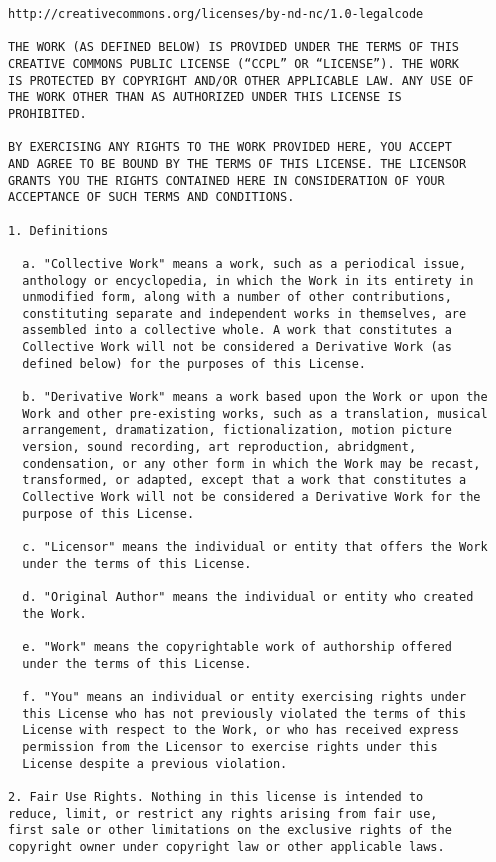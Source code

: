 \begin{Verbatim}[fontsize=\footnotesize]
http://creativecommons.org/licenses/by-nd-nc/1.0-legalcode

THE WORK (AS DEFINED BELOW) IS PROVIDED UNDER THE TERMS OF THIS
CREATIVE COMMONS PUBLIC LICENSE (“CCPL” OR “LICENSE”). THE WORK
IS PROTECTED BY COPYRIGHT AND/OR OTHER APPLICABLE LAW. ANY USE OF
THE WORK OTHER THAN AS AUTHORIZED UNDER THIS LICENSE IS
PROHIBITED.

BY EXERCISING ANY RIGHTS TO THE WORK PROVIDED HERE, YOU ACCEPT
AND AGREE TO BE BOUND BY THE TERMS OF THIS LICENSE. THE LICENSOR
GRANTS YOU THE RIGHTS CONTAINED HERE IN CONSIDERATION OF YOUR
ACCEPTANCE OF SUCH TERMS AND CONDITIONS.

1. Definitions

  a. "Collective Work" means a work, such as a periodical issue,
  anthology or encyclopedia, in which the Work in its entirety in
  unmodified form, along with a number of other contributions,
  constituting separate and independent works in themselves, are
  assembled into a collective whole. A work that constitutes a
  Collective Work will not be considered a Derivative Work (as
  defined below) for the purposes of this License.
  
  b. "Derivative Work" means a work based upon the Work or upon the
  Work and other pre-existing works, such as a translation, musical
  arrangement, dramatization, fictionalization, motion picture
  version, sound recording, art reproduction, abridgment,
  condensation, or any other form in which the Work may be recast,
  transformed, or adapted, except that a work that constitutes a
  Collective Work will not be considered a Derivative Work for the
  purpose of this License.
  
  c. "Licensor" means the individual or entity that offers the Work
  under the terms of this License.
  
  d. "Original Author" means the individual or entity who created
  the Work.
  
  e. "Work" means the copyrightable work of authorship offered
  under the terms of this License.
  
  f. "You" means an individual or entity exercising rights under
  this License who has not previously violated the terms of this
  License with respect to the Work, or who has received express
  permission from the Licensor to exercise rights under this
  License despite a previous violation.

2. Fair Use Rights. Nothing in this license is intended to
reduce, limit, or restrict any rights arising from fair use,
first sale or other limitations on the exclusive rights of the
copyright owner under copyright law or other applicable laws.


\end{Verbatim}
